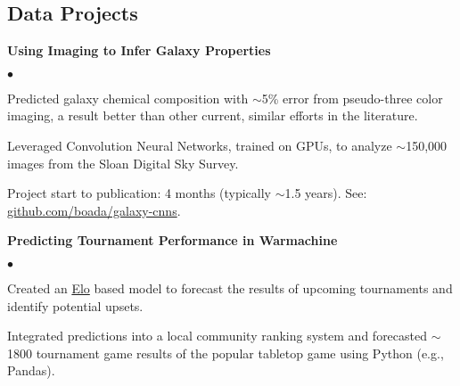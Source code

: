 \documentclass[margin,line, 11pt]{res}
\newenvironment{list2}{
  \begin{list}{$\bullet$}{%
      \setlength{\itemsep}{0in}
      \setlength{\parsep}{0in} \setlength{\parskip}{0in}
      \setlength{\topsep}{0in} \setlength{\partopsep}{0in}
      \setlength{\leftmargin}{0.2in}}}{\end{list}}
\begin{document}
\begin{resume}

\section{Data Projects}
\textbf{Using Imaging to Infer Galaxy Properties}\newline
    \begin{list2}
    	\vspace*{-5mm}
      \item Predicted galaxy chemical composition with $\sim$5\% error from pseudo-three color imaging, a result better than other current, similar efforts in the literature.
    	\item Leveraged Convolution Neural Networks, trained on GPUs, to analyze $\sim$150,000 images from the Sloan Digital Sky Survey.
      \item Project start to publication: 4 months (typically $\sim$1.5 years). See: \href{https://github.com/boada/galaxy-cnns}{github.com/boada/galaxy-cnns}.
    \end{list2}
    \vspace*{-3mm}

\textbf{Predicting Tournament Performance in Warmachine}\newline
    \begin{list2}
    	\vspace*{-5mm}
    	\item Created an \href{https://en.wikipedia.org/wiki/Elo_rating_system}{Elo} based model to forecast the results of upcoming tournaments and identify potential upsets.
    	\item Integrated predictions into a local community ranking system and forecasted $\sim$1800 tournament game results of the popular tabletop game using Python (e.g., Pandas).
    \end{list2}
\vspace*{-1mm}


\end{resume}
\end{document}
